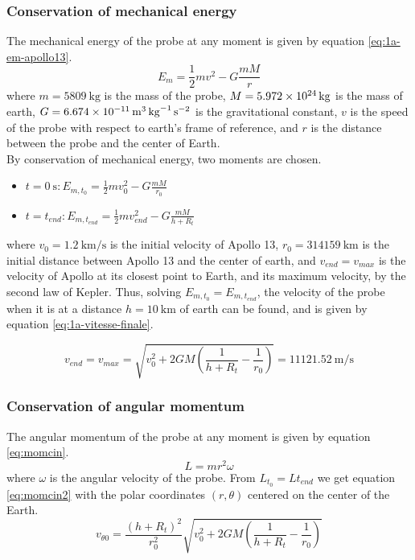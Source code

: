 \documentclass[a4paper,12pt,twoside]{article}
\begin{document}
\subsubsection{Conservation of mechanical energy}
The mechanical energy of the probe at any moment is given by equation \eqref{eq:1a-em-apollo13}.
\begin{equation}
  E_m = \frac{1}{2}mv^2 - G\frac{mM}{r}
  \label{eq:1a-em-apollo13}
\end{equation}
where $m=\SI{5809}{\kilo\gram}$ is the mass of the probe, $M=\SI{5.972d24}{\kilo\gram}$ is the mass of earth, $G=\SI{6.674d-11}{\cubic\meter\per\kilo\gram\per\square\second}$ is the gravitational constant, $v$ is the speed of the probe with respect to earth's frame of reference, and $r$ is the distance between the probe and the center of Earth.\\

By conservation of mechanical energy, two moments are chosen.
\begin{itemize}
  \item $t=\SI{0}{\s}: E_{m,t_0} = \frac{1}{2}mv_0^2 - G\frac{mM}{r_0}$
  \item $t=t_{end}: E_{m,t_{end}} = \frac{1}{2}mv_{end}^2 - G\frac{mM}{h + R_t}$
\end{itemize}
where $v_0 = \SI{1.2}{\kilo\meter\per\second}$ is the initial velocity of Apollo 13, $r_0 = \SI{314159}{\kilo\meter}$ is the initial distance between Apollo 13 and the center of earth, and $v_{end}=v_{max}$ is the velocity of Apollo at its closest point to Earth, and its maximum velocity, by the second law of Kepler.
Thus, solving $E_{m,t_0} = E_{m,t_{end}}$, the velocity of the probe when it is at a distance $h=\SI{10}{\kilo\meter}$ of earth can be found, and is given by equation \eqref{eq:1a-vitesse-finale}.

\begin{equation}
  v_{end} = v_{max} = \sqrt{v_0^2 + 2GM\left(\frac{1}{h + R_t} - \frac{1}{r_0}\right)} = \SI{11121.52}{\meter\per\second}
  \label{eq:1a-vitesse-finale}
\end{equation}

\subsubsection{Conservation of angular momentum}
The angular momentum of the probe at any moment is given by equation \eqref{eq:momcin}.
\begin{equation}
L = mr^2 \omega
\label{eq:momcin}
\end{equation}
where $\omega$ is the angular velocity of the probe. From $ L_{t_0} = L{t_{end}} $ we get equation \eqref{eq:momcin2} with the polar coordinates $(r,\theta)$ centered on the center of the Earth.
\begin{equation}
v_{\theta 0} = \frac{(h+R_t)^2}{r_0^2} \sqrt{v_0^2 + 2 G M \left(\frac{1}{h+R_t}-\frac{1}{r_0}\right)}
\label{eq:momcin2}
\end{equation}
\end{document}
